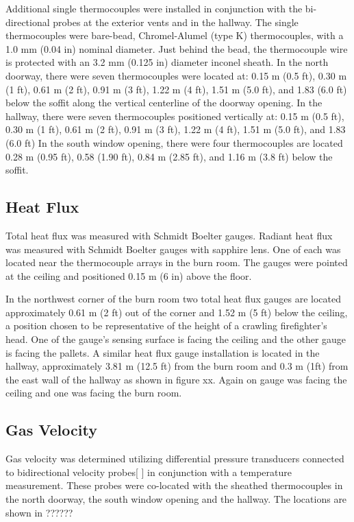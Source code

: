 \documentclass[12pt,oneside]{book}
\begin{document}
	Additional single thermocouples were installed in conjunction with the bi-directional probes at the exterior vents and in the hallway.  The single thermocouples were bare-bead, Chromel-Alumel (type K) thermocouples, with a 1.0 mm (0.04 in) nominal diameter. Just behind the bead, the thermocouple wire is protected with an 3.2 mm (0.125 in) diameter inconel sheath.  
	In the north doorway, there were seven thermocouples were located at: 0.15 m (0.5 ft), 0.30 m (1 ft), 0.61 m (2 ft), 0.91 m (3 ft), 1.22 m (4 ft), 1.51 m (5.0 ft), and 1.83 (6.0 ft) below the soffit along the vertical centerline of the doorway opening.  In the hallway, there were seven thermocouples positioned vertically at: 0.15 m (0.5 ft), 0.30 m (1 ft), 0.61 m (2 ft), 0.91 m (3 ft), 1.22 m (4 ft), 1.51 m (5.0 ft), and 1.83 (6.0 ft)   In the south window opening, there were four thermocouples are located 0.28 m (0.95 ft), 0.58 (1.90 ft), 0.84 m (2.85 ft), and 1.16 m (3.8 ft) below the soffit.  
	
	\subsection{Heat Flux}
	\label{subsec:Heat_Flux}
	
	Total heat flux was measured with Schmidt Boelter gauges.  Radiant heat flux was measured with Schmidt Boelter gauges with sapphire lens.  One of each was located near the thermocouple arrays in the burn room.  The gauges were pointed at the ceiling and positioned 0.15 m (6 in) above the floor.  
	
	In the northwest corner of the burn room two total heat flux gauges are located approximately 0.61 m (2 ft) out of the corner and 1.52 m (5 ft) below the ceiling, a position chosen to be representative of the height of a crawling firefighter’s head.  One of the gauge’s sensing surface is facing the ceiling and the other gauge is facing the pallets.  A similar heat flux gauge installation is located in the hallway, approximately 3.81 m (12.5 ft) from the burn room and 0.3 m (1ft) from the east wall of the hallway as shown in figure xx.  Again on gauge was facing the ceiling and one was facing the burn room.  
	
	\subsection{Gas Velocity}
	\label{subsec:Gas_Velocity}
	
	Gas velocity was determined utilizing differential pressure transducers connected to bidirectional velocity probes[ ] in conjunction with a temperature measurement.  These probes were co-located with the sheathed thermocouples in the north doorway, the south window opening and the hallway.  The locations are shown in ??????
	
\end{document}

